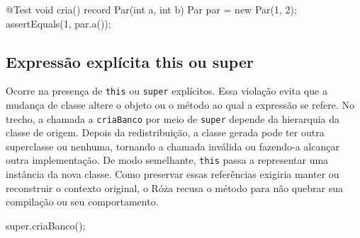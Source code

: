 \begin{violationexample}
@Test void cria() {
    record Par(int a, int b) {}
    Par par = new Par(1, 2);
    assertEquals(1, par.a());
}
\end{violationexample}

\subsection{Expressão explícita this ou super}

Ocorre na presença de \texttt{this} ou \texttt{super} explícitos. Essa violação evita que a mudança de classe altere o objeto ou o método ao qual a expressão se refere. No trecho, a chamada a \texttt{criaBanco} por meio de \texttt{super} depende da hierarquia da classe de origem. Depois da redistribuição, a classe gerada pode ter outra superclasse ou nenhuma, tornando a chamada inválida ou fazendo-a alcançar outra implementação. De modo semelhante, \texttt{this} passa a representar uma instância da nova classe. Como preservar essas referências exigiria manter ou reconstruir o contexto original, o Róża recusa o método para não quebrar sua compilação ou seu comportamento.

\begin{violationexample}
super.criaBanco();
\end{violationexample}
